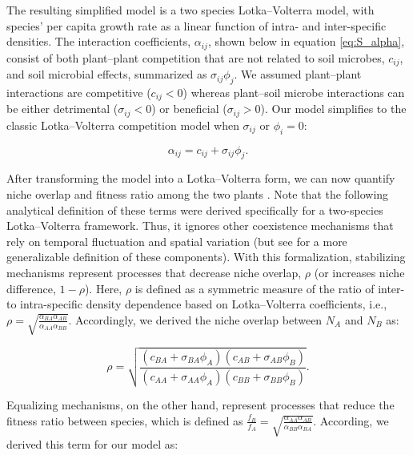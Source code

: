 \noindent The resulting simplified model is a two species Lotka--Volterra model, with species' per capita growth rate as a linear function of intra- and inter-specific densities.
The interaction coefficients, $\alpha_{ij}$, shown below in equation \ref{eq:S_alpha}, consist of both plant--plant competition that are not related to soil microbes, $c_{ij}$, and soil microbial effects, summarized as $\sigma_{ij}\phi_{j}$.
We assumed plant--plant interactions are competitive ($c_{ij} < 0$) whereas plant--soil microbe interactions can be either detrimental ($\sigma_{ij} < 0$) or beneficial ($\sigma_{ij} > 0$). Our model simplifies to the classic Lotka--Volterra competition model when $\sigma_{ij}$ or $\phi_{i} = 0$:

\begin{equation}
\alpha_{ij} = c_{ij} + \sigma_{ij}\phi_{j} .
\tag{S4.17}\label{eq:S_alpha}
\end{equation}

\noindent After transforming the model into a Lotka--Volterra form, we can now quantify niche overlap and fitness ratio among the two plants \citep{Chesson1990, Chesson2008b, Chesson2013ecosys}. Note that the following analytical definition of these terms were derived specifically for a two-species Lotka--Volterra framework. Thus, it ignores other coexistence mechanisms that rely on temporal fluctuation and spatial variation (but see \cite{Chesson2003, Barabas2018} for a more generalizable definition of these components). With this formalization, stabilizing mechanisms represent processes that decrease niche overlap, $\rho$ (or increases niche difference, $1-\rho$). Here, $\rho$ is defined as a symmetric measure of the ratio of inter- to intra-specific density dependence based on Lotka--Volterra coefficients, i.e., $\rho = \sqrt{\frac{\alpha_{BA}\alpha_{AB}}{\alpha_{AA}\alpha_{BB}}}$. Accordingly, we derived the niche overlap between $N_{A}$ and $N_{B}$ as:

\begin{equation}
\rho = \sqrt{\frac{\left ( c_{BA} + \sigma_{BA}\phi_{A} \right )
						   \left ( c_{AB} + \sigma_{AB}\phi_{B} \right )}
						  {\left ( c_{AA} + \sigma_{AA}\phi_{A} \right )
						   \left ( c_{BB} + \sigma_{BB}\phi_{B} \right )}} .
\tag{S4.18}\label{eq:S_ND}
\end{equation}

\noindent Equalizing mechanisms, on the other hand, represent processes that reduce the fitness ratio between species, which is defined as $\frac{f_{B}}{f_{A}} = \sqrt{\frac{\alpha_{AA}\alpha_{AB}}{\alpha_{BB}\alpha_{BA}}}$. According, we derived this term for our model as:

